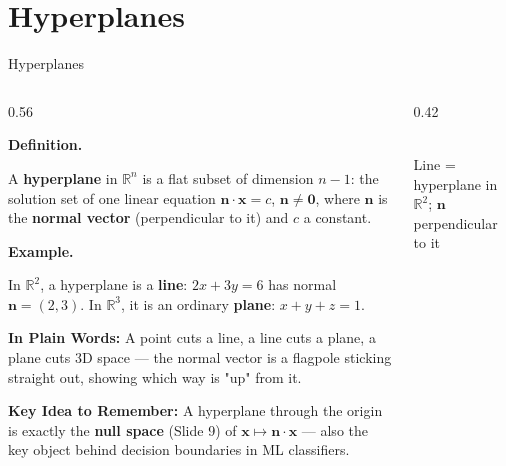 \documentclass[9pt,aspectratio=169]{beamer}
\newcommand{\keyidea}[1]{%
\par\medskip\noindent\textbf{Key Idea to Remember:} #1\par\medskip}
\newcommand{\childex}[1]{%
\par\medskip\noindent\textbf{In Plain Words:} #1\par\medskip}
\begin{document}
\section{Hyperplanes}

\begin{frame}{Hyperplanes}
\footnotesize
\begin{columns}[T]
\begin{column}{0.56\textwidth}
\par\noindent\textbf{Definition.}\par
A \textbf{hyperplane} in $\mathbb{R}^n$ is a flat subset of dimension $n-1$: the solution
set of one linear equation
$\mathbf{n}\cdot\mathbf{x} = c$, $\mathbf{n}\neq \mathbf{0}$,
where $\mathbf{n}$ is the \textbf{normal vector} (perpendicular to it) and $c$ a constant.
\medskip

\par\noindent\textbf{Example.}\par
In $\mathbb{R}^2$, a hyperplane is a \textbf{line}: $2x+3y=6$ has normal $\mathbf{n}=(2,3)$.
In $\mathbb{R}^3$, it is an ordinary \textbf{plane}: $x+y+z=1$.
\medskip

\childex{A point cuts a line, a line cuts a plane, a plane cuts 3D space --- the normal
vector is a flagpole sticking straight out, showing which way is "up" from it.}

\keyidea{A hyperplane through the origin is exactly the \textbf{null space} (Slide 9) of
$\mathbf{x}\mapsto \mathbf{n}\cdot\mathbf{x}$ --- also the key object behind decision
boundaries in ML classifiers.}
\end{column}
\begin{column}{0.42\textwidth}
\centering
{}
\\[0.3em]{\scriptsize Line = hyperplane in $\mathbb{R}^2$; $\mathbf{n}$ perpendicular to it}
\end{column}
\end{columns}
\end{frame}

\end{document}
